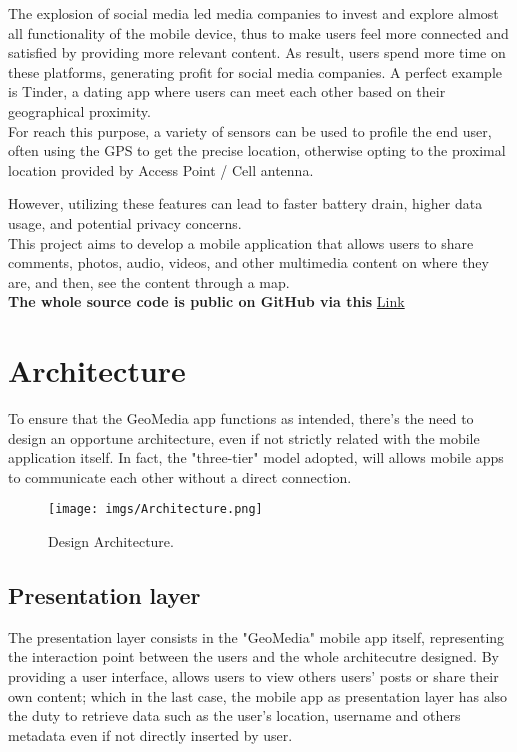 \documentclass[conference]{IEEEtran}
\begin{document}
The explosion of social media led media companies to invest and explore almost all functionality of the mobile device, thus to make users feel more connected and satisfied by providing more relevant content. As result, users spend more time on these platforms, generating profit for social media companies.
A perfect example is Tinder, a dating app where users can meet each other based on their geographical proximity.
\\
For reach this purpose, a variety of sensors can be used to profile the end user, often using the GPS to get the precise location, otherwise opting to the proximal location provided by Access Point / Cell antenna.

However, utilizing these features can lead to faster battery drain, higher data usage, and potential privacy concerns.
\\
This project aims to develop a mobile application that allows users to share comments, photos, audio, videos, and other multimedia content on where they are, and then, see the content through a map.
\\
\textbf{The whole source code is public on GitHub via this} \href{https://github.com/albertomorini/GeoMedia}{Link}


\section{Architecture}


To ensure that the GeoMedia app functions as intended, there's the need to design an opportune architecture, even if not strictly related with the mobile application itself.
In fact, the "three-tier" model adopted, will allows mobile apps to communicate each other without a direct connection.

\begin{figure}[htbp]
{\texttt{[image: imgs/Architecture.png]}}
\caption{Design Architecture.}
\label{fig}
\end{figure}

\subsection{Presentation layer}
The presentation layer consists in the "GeoMedia" mobile app itself, representing the interaction point between the users and the whole architecutre designed.
By providing a user interface, allows users to view others users' posts or share their own content; which in the last case, the mobile app as presentation layer has also the duty to retrieve data such as the user's location, username and others metadata even if not directly inserted by user.
\end{document}
